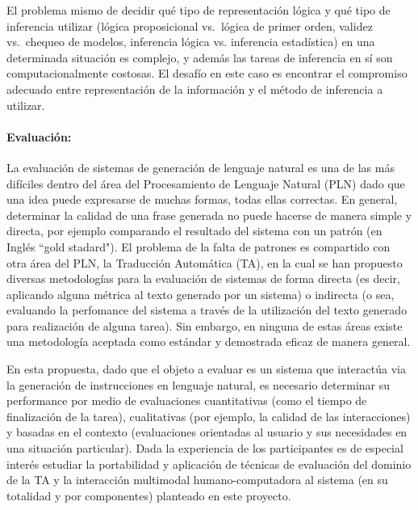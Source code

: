   El problema mismo de decidir qu\'e tipo de representaci\'on l\'ogica y qu\'e tipo de inferencia utilizar (l\'ogica proposicional vs.\ l\'ogica de primer orden, validez vs.\ chequeo de modelos, inferencia l\'ogica vs. inferencia estad\'istica) en una determinada situaci\'on  es complejo, y adem\'as las tareas de inferencia en s\'i son computacionalmente costosas.  El desaf\'io en este caso es encontrar el compromiso adecuado entre representaci\'on de la informaci\'on y el m\'etodo de inferencia a utilizar.

\paragraph{Evaluaci\'on:} La evaluaci\'on de sistemas de generaci\'on de lenguaje natural es una de las m\'as dif\'iciles dentro del \'area del Procesamiento de Lenguaje Natural (PLN) dado que una idea puede expresarse de muchas formas, todas ellas correctas. En general, determinar la calidad de una frase generada no puede hacerse de manera simple y directa, por ejemplo comparando el resultado del sistema con un patr\'on (en Ingl\'es ``gold stadard"). El problema de la falta de patrones es compartido con otra \'area del PLN, la Traducci\'on Autom\'atica (TA), en la cual se han propuesto diversas metodolog\'ias para la evaluaci\'on de sistemas de forma directa (es decir, aplicando alguna m\'etrica al texto generado por un sistema) o indirecta (o sea, evaluando la perfomance del sistema a trav\'es de la utilizaci\'on del texto generado para realizaci\'on de alguna tarea). Sin embargo, en ninguna de estas \'areas existe una metodolog\'ia aceptada como est\'andar y demostrada eficaz de manera general.

En esta propuesta, dado que el objeto a evaluar es un sistema que interact\'ua via la generaci\'on de instrucciones en lenguaje natural, es necesario determinar su performance por medio de evaluaciones cuantitativas (como el tiempo de finalizaci\'on de la tarea), cualitativas (por ejemplo, la calidad de las interacciones) y basadas en el contexto (evaluaciones orientadas al usuario y sus necesidades en una situaci\'on particular). Dada la experiencia de los participantes es de especial inter\'es estudiar la  portabilidad y aplicaci\'on de t\'ecnicas de evaluaci\'on del dominio de la TA y la interacci\'on multimodal humano-computadora al sistema (en su totalidad y por componentes) planteado en este proyecto.

